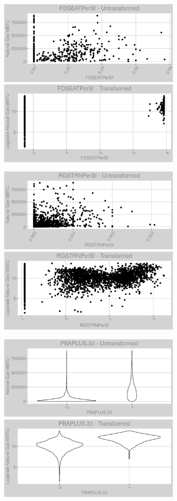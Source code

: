 \begin{figure}
\centering
\begin{subfigure}{1\textwidth}
\centering
\includegraphics[width=.49\textwidth, height=0.3\textheight]{Images/natural_gas_psf_var_original_0.png}
\includegraphics[width=.49\textwidth, height=0.3\textheight]{Images/natural_gas_psf_var_transformed_0.png}
\centering
\end{subfigure}
\begin{subfigure}{1\textwidth}
\centering
\includegraphics[width=.49\textwidth, height=0.3\textheight]{Images/natural_gas_psf_var_original_1.png}
\includegraphics[width=.49\textwidth, height=0.3\textheight]{Images/natural_gas_psf_var_transformed_1.png}
\end{subfigure}
\begin{subfigure}{1\textwidth}
\centering
\includegraphics[width=.49\textwidth, height=0.3\textheight]{Images/natural_gas_psf_var_original_2.png}
\includegraphics[width=.49\textwidth, height=0.3\textheight]{Images/natural_gas_psf_var_transformed_2.png}
\end{subfigure}
\end{figure}
